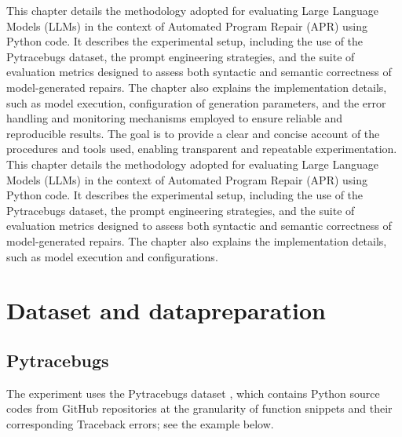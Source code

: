 This chapter details the methodology adopted for evaluating Large Language Models (LLMs) in the context of Automated Program Repair (APR) using Python code. It describes the experimental setup, including the use of the Pytracebugs dataset, the prompt engineering strategies, and the suite of evaluation metrics designed to assess both syntactic and semantic correctness of model-generated repairs. The chapter also explains the implementation details, such as model execution, configuration of generation parameters, and the error handling and monitoring mechanisms employed to ensure reliable and reproducible results. The goal is to provide a clear and concise account of the procedures and tools used, enabling transparent and repeatable experimentation.
This chapter details the methodology adopted for evaluating Large Language Models (LLMs) in the context of Automated Program Repair (APR) using Python code. It describes the experimental setup, including the use of the Pytracebugs dataset, the prompt engineering strategies, and the suite of evaluation metrics designed to assess both syntactic and semantic correctness of model-generated repairs. The chapter also explains the implementation details, such as model execution and configurations.


\section{Dataset and datapreparation}

\subsection{Pytracebugs}
The experiment uses the Pytracebugs dataset \cite{Pytracebugs}, which contains Python source codes from GitHub repositories at the granularity of function snippets and their corresponding Traceback errors; see the example below.


